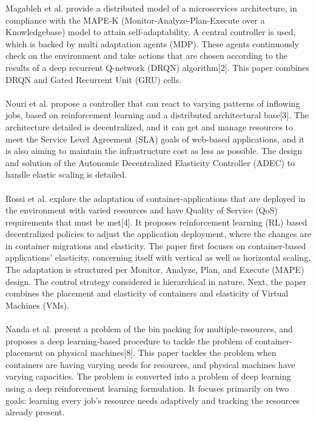 \documentclass[conference]{IEEEtran}
\begin{document}
Magableh et al. provide a distributed model of a microservices architecture, in compliance with the MAPE-K (Monitor-Analyze-Plan-Execute over a Knowledgebase) model to attain self-adaptability. A central controller is used, which is backed by multi adaptation agents (MDP). These agents continuously check on the environment and take actions that are chosen according to the results of a deep recurrent Q-network (DRQN) algorithm[2]. This paper combines DRQN and Gated Recurrent Unit (GRU) cells. \\ \\

Nouri et al. propose a controller that can react to varying patterns of inflowing jobs, based on reinforcement learning and a distributed architectural base[3]. The architecture detailed is decentralized, and it can get and manage resources to meet the Service Level Agreement (SLA) goals of web-based applications, and it is also aiming to maintain the infrastructure cost as less as possible. The design and solution of the Autonomic Decentralized Elasticity Controller (ADEC) to handle elastic scaling is detailed. \\ \\

Rossi et al. explore the adaptation of container-applications that are deployed in the environment with varied resources and have Quality of Service (QoS) requirements that must be met[4]. It proposes reinforcement learning (RL) based decentralized policies to adjust the application deployment, where the changes are in container migrations and elasticity. The paper first focuses on container-based applications' elasticity, concerning itself with vertical as well as horizontal scaling. The adaptation is structured per Monitor, Analyze, Plan, and Execute (MAPE) design. The control strategy considered is hierarchical in nature. Next, the paper combines the placement and elasticity of containers and elasticity of Virtual Machines (VMs). \\ \\

Nanda et al. present a problem of the bin packing for multiple-resources, and proposes a deep learning-based procedure to tackle the problem of container-placement on physical machines[8]. This paper tackles the problem when containers are having varying needs for resources, and physical machines have varying capacities. The problem is converted into a problem of deep learning using a deep reinforcement learning formulation. It focuses primarily on two goals: learning every job's resource needs adaptively and tracking the resources already present. \\ \\
\end{document}
